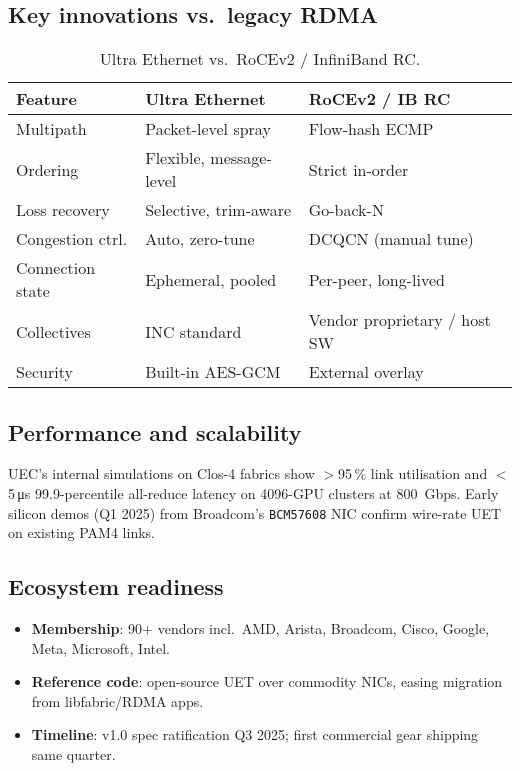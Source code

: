 \subsection{Key innovations vs.\ legacy RDMA}
\begin{table}[ht]
\footnotesize
\caption{Ultra Ethernet vs.\ RoCEv2 / InfiniBand RC.}
\begin{tabular}{@{}p{}p{}p{}@{}}
\toprule
\textbf{Feature} & \textbf{Ultra Ethernet} & \textbf{RoCEv2 / IB RC}\\\midrule
Multipath & Packet-level spray & Flow-hash ECMP\\
Ordering & Flexible, message-level & Strict in-order\\
Loss recovery & Selective, trim-aware & Go-back-N\\
Congestion ctrl. & Auto, zero-tune & DCQCN (manual tune)\\
Connection state & Ephemeral, pooled & Per-peer, long-lived\\
Collectives & INC standard & Vendor proprietary / host SW\\
Security & Built-in AES-GCM & External overlay\\
\bottomrule
\end{tabular}
\end{table}

\subsection{Performance and scalability}
UEC’s internal simulations on Clos-4 fabrics show $>$95\,\% link utilisation
and $<$5\,\si{\micro\second} 99.9-percentile all-reduce latency on 4096-GPU
clusters at \SI{800}{Gbps}.
Early silicon demos (Q1 2025) from Broadcom’s
\texttt{BCM57608} NIC confirm wire-rate UET on existing
PAM4 links.

\subsection{Ecosystem readiness}
\begin{itemize}
  \item \textbf{Membership}: 90+ vendors incl.\ AMD, Arista, Broadcom,
        Cisco, Google, Meta, Microsoft, Intel.
  \item \textbf{Reference code}: open-source UET over commodity NICs,
        easing migration from libfabric/RDMA apps.
  \item \textbf{Timeline}: v1.0 spec ratification Q3 2025; first commercial
        gear shipping same quarter.
\end{itemize}

